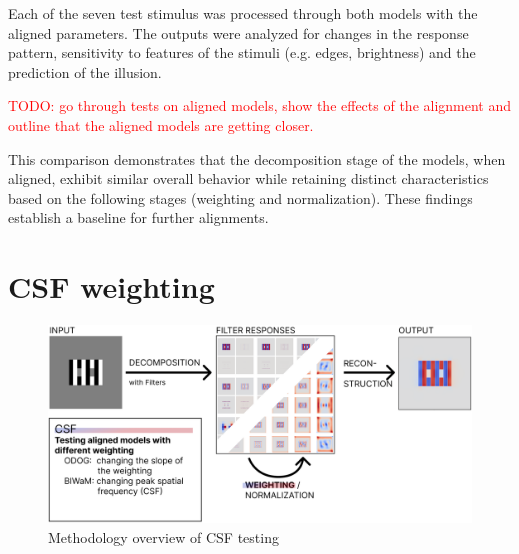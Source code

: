 Each of the seven test stimulus was processed through both models with the aligned
parameters. The outputs were analyzed for changes in the response pattern, sensitivity to
features of the stimuli (e.g. edges, brightness) and the prediction of the illusion.

\textcolor{red}{TODO: go through tests on aligned models, show the effects of the
alignment and outline that the aligned models are getting closer.}

This comparison demonstrates that the decomposition stage of the models, when aligned,
exhibit similar overall behavior while retaining distinct characteristics based on the
following stages (weighting and normalization). These findings establish a baseline for
further alignments.

\newpage
\section{CSF weighting}

\begin{figure}[H]
    \centering
    \includegraphics[width=\linewidth]{media/methodology/csf_overview.png}
    \begin{minipage}{0.8\textwidth}
    \caption{Methodology overview of CSF testing}
    \label{fig:figure13}
    \end{minipage}
\end{figure}

